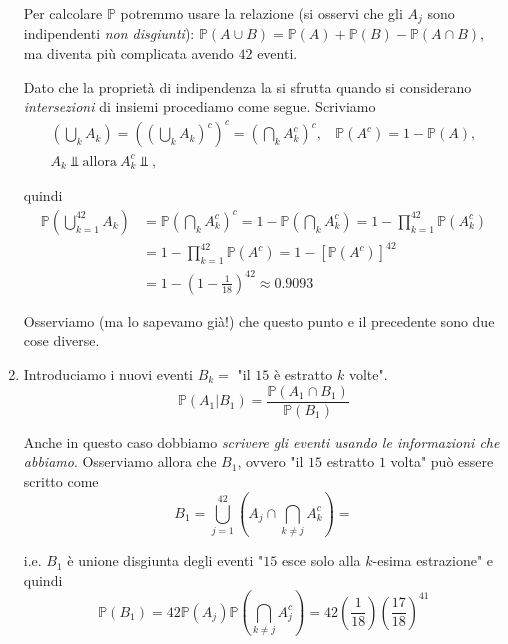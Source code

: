 \begin{enumerate}
Per calcolare $\mathbb{P}$ potremmo usare la relazione (si osservi che gli $A_{j}$ sono indipendenti \textit{non disgiunti}): $\mathbb{P}( A\cup B) =\mathbb{P}( A) +\mathbb{P}( B) -\mathbb{P}( A\cap B)$, ma diventa più complicata avendo $42$ eventi.

Dato che la proprietà di indipendenza la si sfrutta quando si considerano \textit{intersezioni} di insiemi procediamo come segue. Scriviamo\begin{gather*}
\left(\bigcup _{k} A_{k}\right) =\left(\left(\bigcup _{k} A_{k}\right)^{c}\right)^{c} =\left(\bigcap _{k} A_{k}^{c}\right)^{c} ,\ \ \ \ \mathbb{P}\left( A^{c}\right) =1-\mathbb{P}( A) ,\\
A_{k} \Bot \text{allora} \ A_{k}^{c} \Bot ,
\end{gather*}

quindi\begin{equation*}
\begin{aligned}
\mathbb{P}\left(\bigcup _{k=1}^{42} A_{k}\right) & =\mathbb{P}\left(\bigcap _{k} A_{k}^{c}\right)^{c} =1-\mathbb{P}\left(\bigcap _{k} A_{k}^{c}\right) =1-\prod _{k=1}^{42}\mathbb{P}\left( A_{k}^{c}\right)\\
 & =1-\prod _{k=1}^{42}\mathbb{P}\left( A^{c}\right) =1-\left[\mathbb{P}\left( A^{c}\right)\right]^{42}\\
 & =1-\left( 1-\frac{1}{18}\right)^{42} \approx 0.9093
\end{aligned}
\end{equation*}

\begin{oss}
Osserviamo (ma lo sapevamo già!) che questo punto e il precedente sono due cose diverse.
\end{oss}
\item Introduciamo i nuovi eventi $B_{k} =$ "il $15$ è estratto $k$ volte".\begin{equation*}
\mathbb{P}( A_{1} |B_{1}) =\frac{\mathbb{P}( A_{1} \cap B_{1})}{\mathbb{P}( B_{1})}
\end{equation*}

Anche in questo caso dobbiamo \textit{scrivere gli eventi usando le informazioni che abbiamo}. Osserviamo allora che $B_{1}$, ovvero "il $15$ estratto $1$ volta" può essere scritto come\begin{equation*}
B_{1} =\bigcup _{j=1}^{42}\left( A_{j} \cap \bigcap _{k\neq j} A_{k}^{c}\right) =
\end{equation*}

i.e. $B_{1}$ è unione disgiunta degli eventi "$15$ esce solo alla $k$-esima estrazione" e quindi\begin{equation*}
\mathbb{P}( B_{1}) =42\mathbb{P}( A_{j})\mathbb{P}\left(\bigcap _{k\neq j} A_{j}^{c}\right) =42\left(\frac{1}{18}\right)\left(\frac{17}{18}\right)^{41}
\end{equation*}


\end{enumerate}
